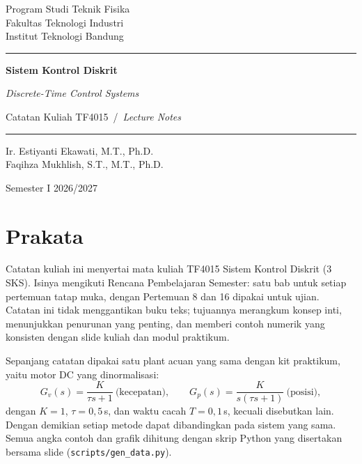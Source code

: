 \documentclass[11pt,a4paper,oneside]{book}
\newcommand{\en}[1]{{\color{skdgray}\textit{#1}}}
\begin{document}
\frontmatter
\begin{titlepage}
	\centering
	\vspace*{2cm}
	{\large Program Studi Teknik Fisika\\Fakultas Teknologi Industri\\Institut Teknologi Bandung\par}
	\vspace{3cm}
	{\color{skdblue}\rule{0.85\textwidth}{1.2pt}\par}
	\vspace{0.5cm}
	{\Huge\bfseries Sistem Kontrol Diskrit\par}
	\vspace{0.3cm}
	{\LARGE\en{Discrete-Time Control Systems}\par}
	\vspace{0.4cm}
	{\large Catatan Kuliah TF4015 \,/\, \en{Lecture Notes}\par}
	\vspace{0.5cm}
	{\color{skdblue}\rule{0.85\textwidth}{1.2pt}\par}
	\vfill
	{\large Ir. Estiyanti Ekawati, M.T., Ph.D.\\[2pt] Faqihza Mukhlish, S.T., M.T., Ph.D.\par}
	\vspace{1.5cm}
	{\large Semester I 2026/2027\par}
\end{titlepage}

\chapter*{Prakata}
Catatan kuliah ini menyertai mata kuliah TF4015 Sistem Kontrol Diskrit (3 SKS). Isinya mengikuti Rencana Pembelajaran Semester: satu bab untuk setiap pertemuan tatap muka, dengan Pertemuan 8 dan 16 dipakai untuk ujian. Catatan ini tidak menggantikan buku teks; tujuannya merangkum konsep inti, menunjukkan penurunan yang penting, dan memberi contoh numerik yang konsisten dengan slide kuliah dan modul praktikum.

Sepanjang catatan dipakai satu plant acuan yang sama dengan kit praktikum, yaitu motor DC yang dinormalisasi:
\[
	G_v(s) = \frac{K}{\tau s + 1}\ \text{(kecepatan)},\qquad G_p(s) = \frac{K}{s(\tau s+1)}\ \text{(posisi)},
\]
dengan $K = 1$, $\tau = 0{,}5$\,s, dan waktu cacah $T = 0{,}1$\,s, kecuali disebutkan lain. Dengan demikian setiap metode dapat dibandingkan pada sistem yang sama. Semua angka contoh dan grafik dihitung dengan skrip Python yang disertakan bersama slide (\texttt{scripts/gen\_data.py}).
\end{document}
